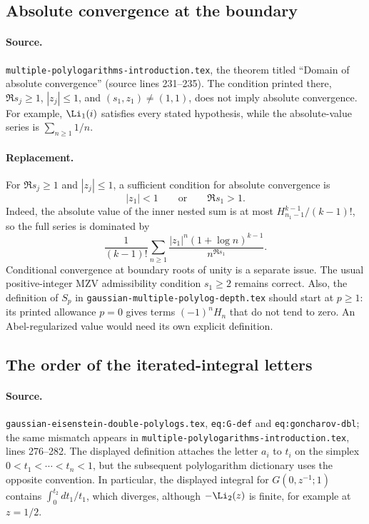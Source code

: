 \subsection{Absolute convergence at the boundary}
\label{audit:poly:convergence}

\paragraph{Source.}
\texttt{multiple-polylogarithms-introduction.tex}, the theorem titled
``Domain of absolute convergence'' (source lines 231--235).
The condition printed there, $\Re s_j\geq1$, $|z_j|\leq1$, and
$(s_1,z_1)\neq(1,1)$, does not imply absolute convergence.
For example, $\Li_1(i)$ satisfies every stated hypothesis, while the
absolute-value series is $\sum_{n\geq1}1/n$.

\paragraph{Replacement.}
For $\Re s_j\geq1$ and $|z_j|\leq1$, a sufficient condition for
absolute convergence is
\[
 |z_1|<1\qquad\text{or}\qquad\Re s_1>1.
\]
Indeed, the absolute value of the inner nested sum is at most
$H_{n_1-1}^{k-1}/(k-1)!$, so the full series is dominated by
\[
 \frac1{(k-1)!}\sum_{n\geq1}
    \frac{|z_1|^n(1+\log n)^{k-1}}{n^{\Re s_1}}.
\]
Conditional convergence at boundary roots of unity is a separate issue.
The usual positive-integer MZV admissibility condition $s_1\geq2$ remains
correct. Also, the definition of $S_p$ in
\texttt{gaussian-multiple-polylog-depth.tex} should start at $p\geq1$:
its printed allowance $p=0$ gives terms $(-1)^nH_n$ that do not tend to
zero. An Abel-regularized value would need its own explicit definition.

\subsection{The order of the iterated-integral letters}
\label{audit:poly:integral-order}

\paragraph{Source.}
\texttt{gaussian-eisenstein-double-polylogs.tex},
\texttt{eq:G-def} and \texttt{eq:goncharov-dbl}; the same mismatch appears
in \texttt{multiple-polylogarithms-introduction.tex}, lines 276--282.
The displayed definition attaches the letter $a_i$ to $t_i$ on the simplex
$0<t_1<\cdots<t_n<1$, but the subsequent polylogarithm dictionary uses the
opposite convention. In particular, the displayed integral for
$G(0,z^{-1};1)$ contains $\int_0^{t_2}dt_1/t_1$, which diverges, although
$-\Li_2(z)$ is finite, for example at $z=1/2$.

